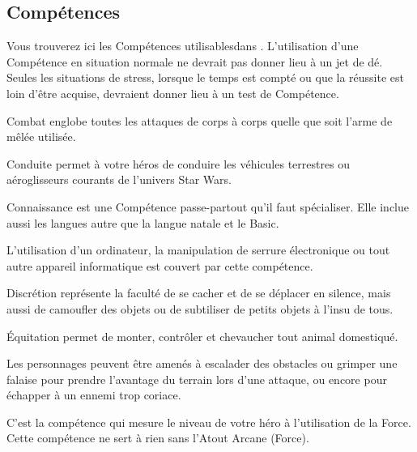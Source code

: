 \subsection{Compétences}
Vous trouverez ici les Compétences utilisables\footnotemark[1] dans \swfe. L’utilisation d’une Compétence en situation normale ne devrait pas donner lieu à un jet de dé. Seules les situations de stress, lorsque le temps est compté ou que la réussite est loin d’être acquise, devraient donner lieu à un test de Compétence.


\begin{description}[align=left]
    \item [Combat (Agi)]
        Combat englobe toutes les attaques de corps à corps quelle que soit l’arme de mêlée utilisée.

    \item [Conduite (Agi)]
        Conduite permet à votre héros de conduire les véhicules terrestres ou aéroglisseurs courants de l'univers Star Wars.

    \item [Connaissance (Int)]
        Connaissance est une Compétence passe-partout qu’il faut spécialiser. Elle inclue aussi les langues autre que la langue natale et le Basic.

    \item [Piratage (Int)]
        L'utilisation d'un ordinateur, la manipulation de serrure électronique ou tout autre appareil informatique est couvert par cette compétence.

    \item [Discrétion (Agi)]
        Discrétion représente la faculté de se cacher et de se déplacer en silence, mais aussi de camoufler des objets ou de subtiliser de petits objets à l’insu de tous.

    \item [Équitation (Agi)]
        Équitation permet de monter, contrôler et chevaucher tout animal domestiqué.

    \item [Escalade (For)]
        Les personnages peuvent être amenés à escalader des obstacles ou grimper une falaise pour prendre l'avantage du terrain lors d'une attaque, ou encore pour échapper à un ennemi trop coriace.

    \item [Maîtrise de la Force (\^Ame)]
        C'est la compétence qui mesure le niveau de votre héro à l'utilisation de la Force. Cette compétence ne sert à rien sans l'Atout Arcane (Force).


\end{description}
